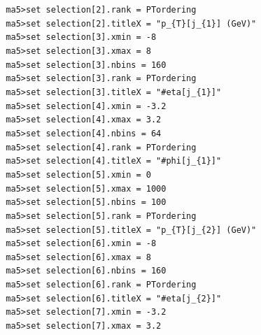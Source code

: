 \documentclass[a4paper, 10pt]{article}
\begin{document}
\texttt{ }\texttt{ }\texttt{ma5>set selection[2].rank = PTordering\\
}
\texttt{ }\texttt{ }\texttt{ma5>set selection[2].titleX = "p\_\{T\}[j\_\{1\}] (GeV)"\\
}
\texttt{ }\texttt{ }\texttt{ma5>set selection[3].xmin = -8\\
}
\texttt{ }\texttt{ }\texttt{ma5>set selection[3].xmax = 8\\
}
\texttt{ }\texttt{ }\texttt{ma5>set selection[3].nbins = 160\\
}
\texttt{ }\texttt{ }\texttt{ma5>set selection[3].rank = PTordering\\
}
\texttt{ }\texttt{ }\texttt{ma5>set selection[3].titleX = "\#eta[j\_\{1\}]"\\
}
\texttt{ }\texttt{ }\texttt{ma5>set selection[4].xmin = -3.2\\
}
\texttt{ }\texttt{ }\texttt{ma5>set selection[4].xmax = 3.2\\
}
\texttt{ }\texttt{ }\texttt{ma5>set selection[4].nbins = 64\\
}
\texttt{ }\texttt{ }\texttt{ma5>set selection[4].rank = PTordering\\
}
\texttt{ }\texttt{ }\texttt{ma5>set selection[4].titleX = "\#phi[j\_\{1\}]"\\
}
\texttt{ }\texttt{ }\texttt{ma5>set selection[5].xmin = 0\\
}
\texttt{ }\texttt{ }\texttt{ma5>set selection[5].xmax = 1000\\
}
\texttt{ }\texttt{ }\texttt{ma5>set selection[5].nbins = 100\\
}
\texttt{ }\texttt{ }\texttt{ma5>set selection[5].rank = PTordering\\
}
\texttt{ }\texttt{ }\texttt{ma5>set selection[5].titleX = "p\_\{T\}[j\_\{2\}] (GeV)"\\
}
\texttt{ }\texttt{ }\texttt{ma5>set selection[6].xmin = -8\\
}
\texttt{ }\texttt{ }\texttt{ma5>set selection[6].xmax = 8\\
}
\texttt{ }\texttt{ }\texttt{ma5>set selection[6].nbins = 160\\
}
\texttt{ }\texttt{ }\texttt{ma5>set selection[6].rank = PTordering\\
}
\texttt{ }\texttt{ }\texttt{ma5>set selection[6].titleX = "\#eta[j\_\{2\}]"\\
}
\texttt{ }\texttt{ }\texttt{ma5>set selection[7].xmin = -3.2\\
}
\texttt{ }\texttt{ }\texttt{ma5>set selection[7].xmax = 3.2\\
}
\end{document}
